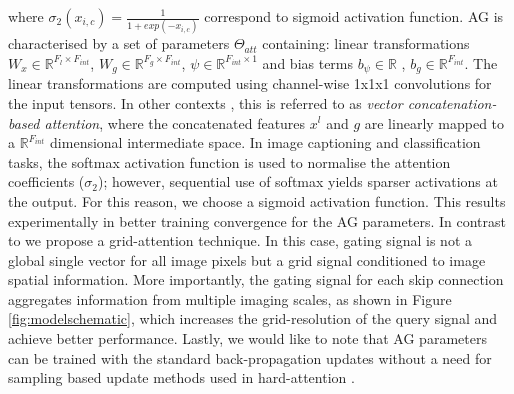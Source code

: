 \documentclass{article}
\newcommand{\R}[0]{\mathbb{R}} \newcommand\newsubcap[1]{\phantomcaption \caption*{\figurename~\thefigure(\thesubfigure): #1}}
\begin{document}
where $\sigma_2(x_{i,c}) = \frac{1}{1+exp(-x_{i,c})}$ correspond to sigmoid activation function. AG is characterised by a set of parameters $\Theta_{att}$ containing: linear transformations $W_x \in \R^{F_l \times F_{int}}$, $W_g \in  \R^{F_g \times F_{int}}$, $\psi \in \R^{F_{int} \times 1}$ and bias terms $b_{\psi} \in \R$ , $b_{g} \in \R^{F_{int}}$. The linear transformations are computed using channel-wise 1x1x1 convolutions for the input tensors. In other contexts \cite{wang2017non}, this is referred to as \emph{vector concatenation-based attention}, where the concatenated features $x^l$ and $g$ are linearly mapped to a $\R^{F_{int}}$ dimensional intermediate space. In image captioning \cite{anderson2017bottom} and classification \cite{jetley2018learn} tasks, the softmax activation function is used to normalise the attention coefficients ($\sigma_2$); however, sequential use of softmax yields sparser activations at the output. For this reason, we choose a sigmoid activation function. This results experimentally in better training convergence for the AG parameters. In contrast to \cite{jetley2018learn} we propose a grid-attention technique. In this case, gating signal is not a global single vector for all image pixels but a grid signal conditioned to image spatial information. More importantly, the gating signal for each skip connection aggregates information from multiple imaging scales, as shown in Figure \ref{fig:modelschematic}, which increases the grid-resolution of the query signal and achieve better performance. Lastly, we would like to note that AG parameters can be trained with the standard back-propagation updates without a need for sampling based update methods used in hard-attention \cite{mnih2014recurrent}. 
\end{document}
